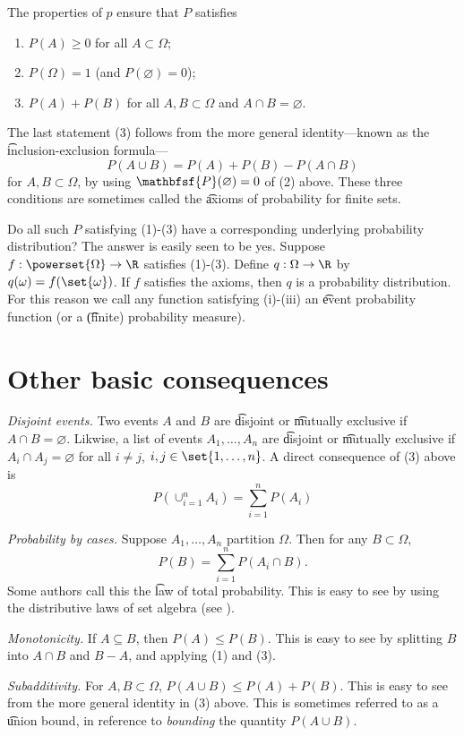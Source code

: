 The properties of $p$ ensure that $P$ satisfies
    \begin{enumerate}
      \item $P(A) \geq 0$ for all $A \subset \Omega $;
      \item $P(\Omega ) = 1$ (and $P(\varnothing) = 0$);
      \item $P(A) + P(B)$ for all $A, B \subset \Omega $ and $A \cap  B = \varnothing$.
    \end{enumerate}
The last statement (3) follows from the more general identity---known as the \t{inclusion-exclusion formula}---
\[
P(A \cup B) = P(A) + P(B) - P(A \cap  B)
\]
for $A, B \subset \Omega $, by using $\mathbfsf{P} (\varnothing) = 0$ of (2) above.
These three conditions are sometimes called the \t{axioms of probability for finite sets}.

Do all such $P$ satisfying (1)-(3) have a corresponding underlying probability distribution?
The answer is easily seen to be yes.
Suppose $f: \powerset{\Omega } \to \R $ satisfies (1)-(3).
Define $q: \Omega  \to \R $ by $q(\omega ) = f(\set{\omega })$.
If $f$ satisfies the axioms, then $q$ is a probability distribution.
For this reason we call any function satisfying (i)-(iii) an \t{event probability function} (or a \t{(finite) probability measure}).

\section*{Other basic consequences}

\textit{Disjoint events.}
Two events $A$ and $B$ are \t{disjoint} or \t{mutually exclusive} if $A \cap  B = \varnothing$.
Likwise, a list of events $A_1, \dots , A_n$ are \t{disjoint} or \t{mutually exclusive} if $A_i \cap  A_j = \varnothing$ for all $i \neq j$, $i,j \in \set{1, \dots , n}$.
A direct consequence of (3) above is
\[
\textstyle
P(\cup_{i =1 }^{n} A_i) = \sum_{i = 1}^{n} P(A_i)
\]

\textit{Probability by cases.}
Suppose $A_1, \dots , A_n$ partition $\Omega $.
Then for any $B \subset \Omega $,
\[
\textstyle
P(B) = \sum_{i = 1}^{n} P(A_i \cap  B).
\]
Some authors call this the \t{law of total probability}.
This is easy to see by using the distributive laws of set algebra (see ).

\textit{Monotonicity.}
If $A \subseteq B$, then $P(A) \leq P(B)$.
This is easy to see by splitting $B$ into $A \cap  B$ and $B - A$, and applying (1) and (3).

\textit{Subadditivity.}
For $A, B \subset \Omega $, $P(A \cup B) \leq P(A) + P(B)$.
This is easy to see from the more general identity in (3) above.
This is sometimes referred to as a \t{union bound}, in reference to \textit{bounding} the quantity $P(A \cup B)$.
